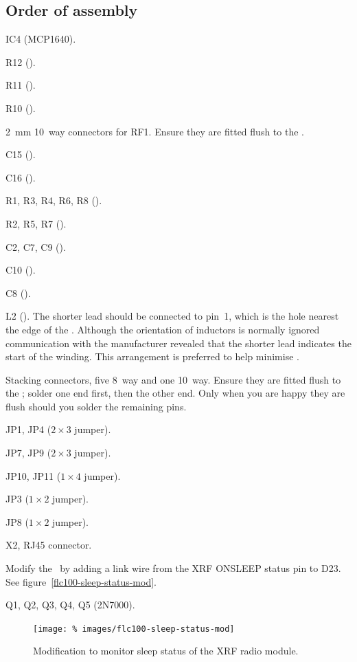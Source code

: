 \subsection{Order of assembly}
\begin{buildorder}
\item IC4 (MCP1640).
\item R12 ().
\item R11 ().
\item R10 ().
\item \SI{2}{\milli\metre} 10~way connectors for RF1. Ensure they are
  fitted flush to the \pcb.
\item C15 ().
\item C16 ().
\item R1, R3, R4, R6, R8 ().
\item R2, R5, R7 ().
\item C2, C7, C9 ().
\item C10 ().
\item C8 ().
\item L2 (). The shorter lead should be connected to pin~1,
  which is the hole nearest the edge of the \pcb. Although the
  orientation of inductors is normally ignored communication with the
  manufacturer revealed that the shorter lead indicates the start of
  the winding. This arrangement is preferred to help minimise \rfi.
\item Stacking connectors, five 8~way and one 10~way. Ensure they are
  fitted flush to the \pcb; solder one end first, then the other
  end. Only when you are happy they are flush should you solder the
  remaining pins.
\item JP1, JP4 ($2 \times 3$ jumper).
\item JP7, JP9 ($2 \times 3$ jumper).
\item JP10, JP11 ($1 \times 4$ jumper).
\item JP3 ($1 \times 2$ jumper).
\item JP8 ($1 \times 2$ jumper).
\item X2, RJ45 connector.
\item Modify the \pcb\ by adding a link wire from the XRF ONSLEEP
  status pin to D23. See figure~\ref{flc100-sleep-status-mod}.
\item Q1, Q2, Q3, Q4, Q5 (2N7000).
\end{buildorder}

\begin{figure}
  \centering
  \texttt{[image: \%
    images/flc100-sleep-status-mod]}
  \caption[Modification to monitor sleep status of the XRF radio module]{%
    Modification to monitor sleep status of the XRF radio module.
    }
  \label{fig:flc100-sleep-status-mod}
\end{figure}


